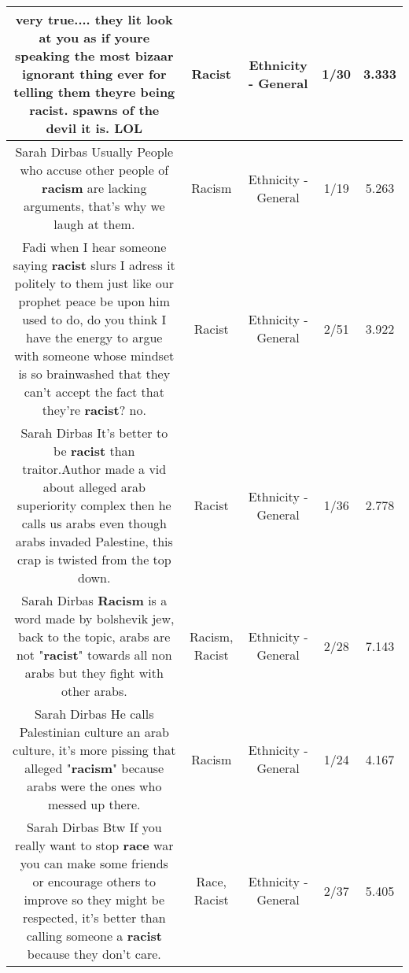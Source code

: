 \documentclass[11pt]{article}
\newlength\mylength
\begin{document}
\begin{center}
\begin{longtable}{|C{.65\mylength}|C{.30\mylength}|C{.12\mylength}|C{.12\mylength}|C{.12\mylength}|}
  \small very true.... they lit look at you as if youre speaking the most bizaar ignorant thing ever for telling them theyre being \textbf{racist}. spawns of the devil it is. LOL\normalsize   & Racist & Ethnicity - General & 1/30 & 3.333 \\  \hline
  \small Sarah Dirbas Usually People who accuse other people of \textbf{racism}  are lacking arguments, that's why we laugh at them.\normalsize   & Racism & Ethnicity - General & 1/19 & 5.263 \\  \hline
  \small Fadi when I hear someone saying \textbf{racist} slurs I adress it politely to them just like our prophet peace be upon him used to do, do you think I have the energy to argue with someone whose mindset is so brainwashed that they can't accept the fact that they're \textbf{racist}? no.\normalsize   & Racist & Ethnicity - General & 2/51 & 3.922 \\  \hline
  \small Sarah Dirbas It's better to be \textbf{racist} than traitor.Author made a vid about alleged arab superiority complex then he calls us arabs even though arabs invaded Palestine, this crap is twisted from the top down.\normalsize   & Racist & Ethnicity - General & 1/36 & 2.778 \\  \hline
  \small Sarah Dirbas \textbf{Racism} is a word made by bolshevik jew, back to the topic, arabs are not "\textbf{racist}" towards all non arabs but they fight with other arabs.\normalsize   & Racism, Racist & Ethnicity - General & 2/28 & 7.143 \\  \hline
  \small Sarah Dirbas He calls Palestinian culture an arab culture, it's more pissing that alleged "\textbf{racism}" because arabs were the ones who messed up there.\normalsize   & Racism & Ethnicity - General & 1/24 & 4.167 \\  \hline
  \small Sarah Dirbas Btw If you really want to stop \textbf{race} war you can make some friends or encourage others to improve so they might be respected, it's better than calling someone a \textbf{racist} because they don't care.\normalsize   & Race, Racist & Ethnicity - General & 2/37 & 5.405 \\  \hline

\end{longtable}
\end{center}
\end{document}
